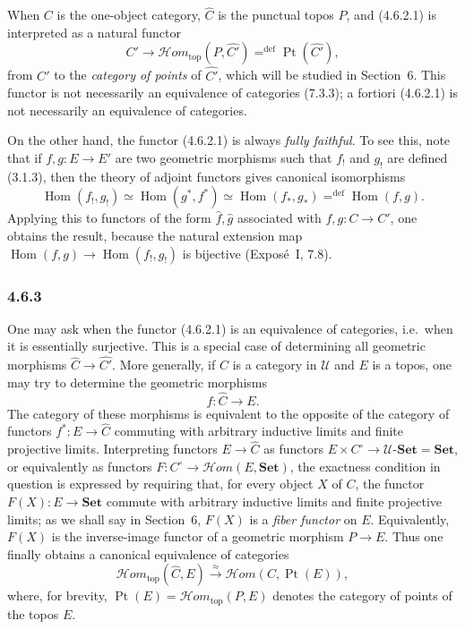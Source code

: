 \documentclass[11pt]{article}
\newcommand{\U}{\mathcal{U}}
\newcommand{\Set}{\mathbf{Set}}
\newcommand{\Hom}{\operatorname{Hom}}
\newcommand{\Ppoints}{\operatorname{Pt}}
\newcommand{\Hhom}{\mathcal{H}om}
\newcommand{\Hhomtop}{\mathcal{H}om_{\mathrm{top}}}
\newcommand{\dfn}{\mathrm{def}}
\newcommand{\ie}{i.e.}
\begin{document}
When \(C\) is the one-object category, \(\widehat C\) is the punctual topos \(P\), and (4.6.2.1) is interpreted as a natural functor
\[
C'\longrightarrow \Hhomtop(P,\widehat{C'})\mathop{=}^{\dfn}\Ppoints(\widehat{C'}),\tag{4.6.2.2}
\]
from \(C'\) to the \emph{category of points} of \(\widehat{C'}\), which will be studied in Section~6. This functor is not necessarily an equivalence of categories (7.3.3); a fortiori (4.6.2.1) is not necessarily an equivalence of categories.

On the other hand, the functor (4.6.2.1) is always \emph{fully faithful}. To see this, note that if \(f,g:E\to E'\) are two geometric morphisms such that \(f_!\) and \(g_!\) are defined (3.1.3), then the theory of adjoint functors gives canonical isomorphisms
\[
\Hom(f_!,g_!)\simeq\Hom(g^\ast,f^\ast)\simeq\Hom(f_\ast,g_\ast)\mathop{=}^{\dfn}\Hom(f,g).
\]
Applying this to functors of the form \(\widehat f,\widehat g\) associated with \(f,g:C\to C'\), one obtains the result, because the natural extension map \(\Hom(f,g)\to\Hom(f_!,g_!)\) is bijective (Expos\'e~I, 7.8).

\subsubsection*{4.6.3}
One may ask when the functor (4.6.2.1) is an equivalence of categories, \ie\ when it is essentially surjective. This is a special case of determining all geometric morphisms \(\widehat C\to\widehat{C'}\). More generally, if \(C\) is a category in \(\U\) and \(E\) is a topos, one may try to determine the geometric morphisms
\[
f:\widehat C\longrightarrow E.
\]
The category of these morphisms is equivalent to the opposite of the category of functors \(f^\ast:E\to\widehat C\) commuting with arbitrary inductive limits and finite projective limits. Interpreting functors \(E\to\widehat C\) as functors \(E\times C^\circ\to\U\text{-}\Set=\Set\), or equivalently as functors \(F:C^\circ\to\Hhom(E,\Set)\), the exactness condition in question is expressed by requiring that, for every object \(X\) of \(C\), the functor \(F(X):E\to\Set\) commute with arbitrary inductive limits and finite projective limits; as we shall say in Section~6, \(F(X)\) is a \emph{fiber functor} on \(E\). Equivalently, \(F(X)\) is the inverse-image functor of a geometric morphism \(P\to E\). Thus one finally obtains a canonical equivalence of categories
\[
\Hhomtop(\widehat C,E)\xrightarrow{\approx}\Hhom(C,\Ppoints(E)),\tag{4.6.3.1}
\]
where, for brevity, \(\Ppoints(E)=\Hhomtop(P,E)\) denotes the category of points of the topos \(E\).
\end{document}
